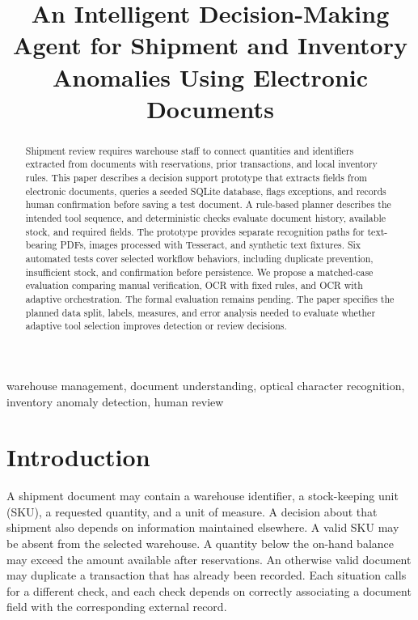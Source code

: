 \documentclass[conference]{IEEEtran}
\begin{document}
\title{An Intelligent Decision-Making Agent for Shipment and Inventory Anomalies Using Electronic Documents}
\author{}
\maketitle

\begin{abstract}
Shipment review requires warehouse staff to connect quantities and identifiers extracted from documents with reservations, prior transactions, and local inventory rules. This paper describes a decision support prototype that extracts fields from electronic documents, queries a seeded SQLite database, flags exceptions, and records human confirmation before saving a test document. A rule-based planner describes the intended tool sequence, and deterministic checks evaluate document history, available stock, and required fields. The prototype provides separate recognition paths for text-bearing PDFs, images processed with Tesseract, and synthetic text fixtures. Six automated tests cover selected workflow behaviors, including duplicate prevention, insufficient stock, and confirmation before persistence. We propose a matched-case evaluation comparing manual verification, OCR with fixed rules, and OCR with adaptive orchestration. The formal evaluation remains pending. The paper specifies the planned data split, labels, measures, and error analysis needed to evaluate whether adaptive tool selection improves detection or review decisions.
\end{abstract}

\begin{IEEEkeywords}
warehouse management, document understanding, optical character recognition, inventory anomaly detection, human review
\end{IEEEkeywords}

\section{Introduction}
A shipment document may contain a warehouse identifier, a stock-keeping unit (SKU), a requested quantity, and a unit of measure. A decision about that shipment also depends on information maintained elsewhere. A valid SKU may be absent from the selected warehouse. A quantity below the on-hand balance may exceed the amount available after reservations. An otherwise valid document may duplicate a transaction that has already been recorded. Each situation calls for a different check, and each check depends on correctly associating a document field with the corresponding external record.
\end{document}
